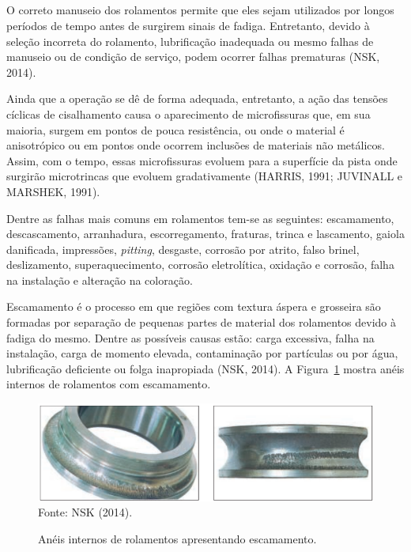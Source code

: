\documentclass[
	12pt,				
	oneside,			
	a4paper,			
	english,			
	brazil,	
	sumario=abnt-6027-2012		
	]{abntex2ppgsi}
\begin{document}
\subsection{}

O correto manuseio dos rolamentos permite que eles sejam utilizados por longos períodos de tempo antes de surgirem sinais de fadiga. Entretanto, devido à seleção incorreta do rolamento, lubrificação inadequada ou mesmo falhas de manuseio ou de condição de serviço, podem ocorrer falhas prematuras (NSK, 2014).

Ainda que a operação se dê de forma adequada, entretanto, a ação das tensões cíclicas de cisalhamento causa o aparecimento de microfissuras que, em sua maioria, surgem em pontos de pouca resistência, ou onde o material é anisotrópico  ou em pontos onde ocorrem inclusões de materiais não metálicos. Assim, com o tempo, essas microfissuras evoluem para a superfície da pista onde surgirão microtrincas que evoluem gradativamente (HARRIS, 1991; JUVINALL e MARSHEK, 1991).

Dentre as falhas mais comuns em rolamentos tem-se as seguintes: escamamento, descascamento, arranhadura, escorregamento, fraturas, trinca e lascamento, gaiola danificada, impressões, \textit{pitting}, desgaste, corrosão por atrito, falso brinel, deslizamento, superaquecimento, corrosão eletrolítica, oxidação e corrosão, falha na instalação e alteração na coloração.

Escamamento é o processo em que regiões com textura áspera e grosseira são formadas por separação de pequenas partes de material dos rolamentos devido à fadiga do mesmo. Dentre as possíveis causas estão: carga excessiva, falha na instalação, carga de momento elevada, contaminação por partículas ou por água, lubrificação deficiente ou folga inapropiada (NSK, 2014). A Figura~\ref{escamemento_nsk} mostra anéis internos de rolamentos com escamamento. 

\begin{figure}[H]
\centering
\caption {Anéis internos de rolamentos apresentando escamamento.}
\includegraphics[width=\textwidth,height=\textheight,keepaspectratio]{escamamento_nsk} \\
Fonte: NSK (2014).
\label{escamemento_nsk}
\end{figure}
\end{document}
